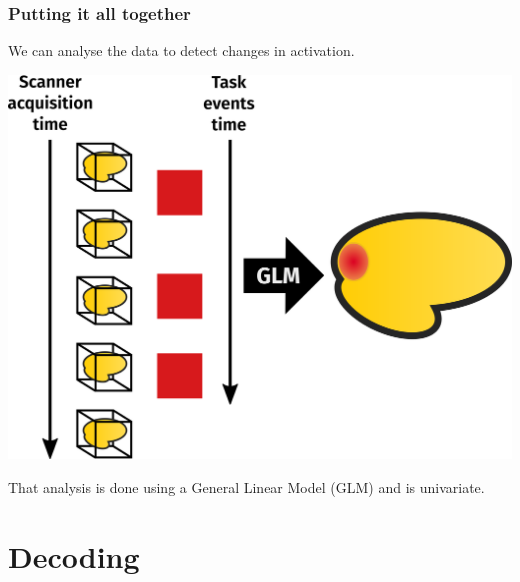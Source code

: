 \documentclass[11pt]{beamer}
\begin{document}
\begin{frame}
    \frametitle{Putting it all together}
    
    We can analyse the data to detect changes in activation. 

    \begin{center}
        \includegraphics[scale=0.1]{figures/glm.png}
    \end{center}

    That analysis is done using a General Linear Model (GLM) and is univariate.

\end{frame}

\section{Decoding}
\label{sec:Decoding}
\end{document}
